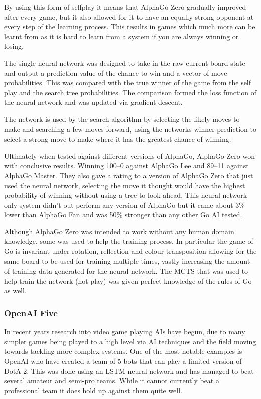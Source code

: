 \documentclass[a4paper]{article}
\begin{document}
By using this form of selfplay it means that AlphaGo Zero gradually improved after every game, but it also allowed for it to have an equally strong opponent at every step of the learning process.
This results in games which much more can be learnt from as it is hard to learn from a system if you are always winning or losing.
\par
The single neural network was designed to take in the raw current board state and output a prediction value of the chance to win and a vector of move probabilities.
This was compared with the true winner of the game from the self play and the search tree probabilities.
The comparison formed the loss function of the neural network and was updated via gradient descent.
\par
The network is used by the search algorithm by selecting the likely moves to make and searching a few moves forward, using the networks winner prediction to select a strong move to make where it has the greatest chance of winning.
\par
Ultimately when tested against different versions of AlphaGo, AlphaGo Zero won with conclusive results.
Winning 100--0 against AlphaGo Lee and 89--11 against AlphaGo Master.
They also gave a rating to a version of AlphaGo Zero that just used the neural network, selecting the move it thought would have the highest probability of winning without using a tree to look ahead.
This neural network only system didn't out perform any version of AlphaGo but it came about 3\% lower than AlphaGo Fan and was 50\% stronger than any other Go AI tested.
\par
Although AlphaGo Zero was intended to work without any human domain knowledge, some was used to help the training process.
In particular the game of Go is invariant under rotation, reflection and colour transposition allowing for the same board to be used for training multiple times, vastly increasing the amount of training data generated for the neural network.
The MCTS that was used to help train the network (not play) was given perfect knowledge of the rules of Go as well.

\subsubsection{OpenAI Five}

In recent years research into video game playing AIs have begun, due to many simpler games being played to a high level via AI techniques and the field moving towards tackling more complex systems.
One of the most notable examples is OpenAI who have created a team of 5 bots that can play a limited version of DotA 2\cite{OpenAIFive}.
This was done using an LSTM neural network and has managed to beat several amateur and semi-pro teams.
While it cannot currently beat a professional team it does hold up against them quite well.
\end{document}
